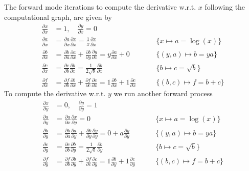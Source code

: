 The forward mode iterations to compute the derivative w.r.t. \(x\)
following the computational graph, are given by
\begin{align*}
 \frac{\partial x}{\partial x} &= 1, \quad
 \frac{\partial y}{\partial x} = 0\\
 \frac{\partial a}{\partial x} &=
 \frac{\partial a}{\partial x} \frac{\partial x}{\partial x} =
 \frac{1}{x} \frac{\partial x}{\partial x} \qquad
 &\{x \mapsto a = \log(x)\}\\
 \frac{\partial b}{\partial x} &=
 \frac{\partial b}{\partial a} \frac{\partial a}{\partial x} +
 \frac{\partial b}{\partial y} \frac{\partial y}{\partial x} =
 y \frac{\partial a}{\partial x} + 0 \qquad
 &\{(y, a) \mapsto b = ya\}\\
 \frac{\partial c}{\partial x} &=
 \frac{\partial c}{\partial b} \frac{\partial b}{\partial x} =
 \frac{1}{2\sqrt{b}} \frac{\partial b}{\partial x} \qquad
 &\{b \mapsto c = \sqrt{b}\}\\
 \frac{\partial f}{\partial x} &=
 \frac{\partial f}{\partial b} \frac{\partial b}{\partial x} +
 \frac{\partial f}{\partial c} \frac{\partial c}{\partial x} =
 1 \frac{\partial b}{\partial x} + 1 \frac{\partial c}{\partial x}
 \qquad &\{(b, c) \mapsto f = b + c\}
\end{align*}
To compute the derivative w.r.t. \(y\) we run another forward process
\begin{align*}
 \frac{\partial x}{\partial y} &= 0, \quad
 \frac{\partial y}{\partial y} = 1\\
 \frac{\partial a}{\partial y} &=
 \frac{\partial a}{\partial x} \frac{\partial x}{\partial y} = 0 \qquad
 &\{x \mapsto a = \log(x)\}\\
 \frac{\partial b}{\partial y} &=
 \frac{\partial b}{\partial a} \frac{\partial a}{\partial y} +
 \frac{\partial b}{\partial y} \frac{\partial y}{\partial y} =
 0 + a \frac{\partial y}{\partial y}\qquad
 &\{(y, a) \mapsto b = ya\}\\
 \frac{\partial c}{\partial y} &=
 \frac{\partial c}{\partial b} \frac{\partial b}{\partial y} =
 \frac{1}{2\sqrt{b}} \frac{\partial b}{\partial y} \qquad
 &\{b \mapsto c = \sqrt{b}\}\\
 \frac{\partial f}{\partial y} &=
 \frac{\partial f}{\partial b} \frac{\partial b}{\partial y} +
 \frac{\partial f}{\partial c} \frac{\partial c}{\partial y} =
 1 \frac{\partial b}{\partial y} + 1 \frac{\partial c}{\partial y}
 \qquad &\{(b, c) \mapsto f = b + c\}
\end{align*}

